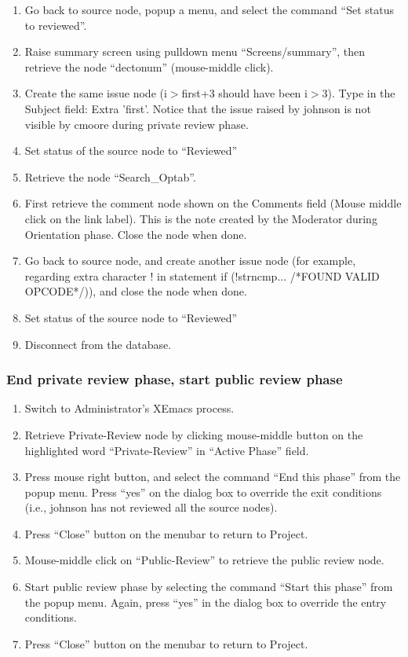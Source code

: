 \begin{enumerate}
\item Go back to source node, popup a menu, and select the command 
``Set status to reviewed''.
\item Raise summary screen using pulldown menu ``Screens/summary'', then
retrieve the node ``dectonum'' (mouse-middle click).
\item Create the same issue node (i$>$first+3 should have been i$>$3).
Type in the Subject field: Extra 'first'.
Notice that the issue raised by johnson is not visible by cmoore
during private review phase.
\item Set status of the source node to ``Reviewed''
\item Retrieve the node ``Search\_Optab''.
\item First retrieve the comment node shown on the Comments field
 (Mouse middle click on the link label).
This is the note created by the Moderator during Orientation phase.
Close the node when done.
\item Go back to source node, and create another issue node (for
example, regarding extra character ! in 
statement if (!strncmp... /*FOUND VALID OPCODE*/)), and close the node
when done. 
\item  Set status of the source node to ``Reviewed''
\item Disconnect from the database.
\end{enumerate}

\subsubsection{End private review phase, start public review phase}

\begin{enumerate}
\item Switch to Administrator's XEmacs process.
\item Retrieve Private-Review node by clicking mouse-middle button
on the highlighted word ``Private-Review'' in ``Active Phase'' field.
\item Press mouse right button, and select the command ``End this
phase'' from the popup menu. Press ``yes'' on the dialog box to
override the exit conditions (i.e., johnson has not reviewed all the
source nodes).
\item Press ``Close'' button on the menubar to return to Project.
\item Mouse-middle click on ``Public-Review'' to retrieve the public review
node.  
\item Start public review phase by selecting the command ``Start this
phase'' from the popup menu. Again, press ``yes'' in the dialog box to
override the entry conditions.  
\item Press ``Close'' button on the menubar to return to Project.
\end{enumerate}


